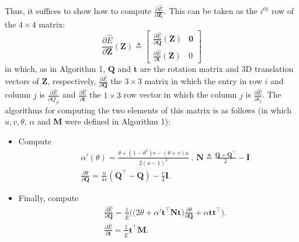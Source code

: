 Thus, it suffices to show how to compute $\frac{\partial \widehat{E}}{\partial \mathbf{Z}_i}$. This can be taken as the $i^{th}$ row of the $4 \times 4$ matrix:
\begin{equation}
    \frac{\partial \widehat{E}}{\partial \mathbf{Z}}(\mathbf{Z}) \triangleq \left[\begin{array}{cc} \frac{\partial \widehat{E}}{\partial \mathbf{Q}}( \mathbf{Z}) & \mathbf{0} \\
    \frac{\partial \widehat{E}}{\partial \mathbf{t}}( \mathbf{Z}) & 0 \end{array}\right]
\end{equation}
\noindent in which, as in Algorithm 1, $\mathbf{Q}$ and $\mathbf{t}$ are the rotation matrix and 3D translation vectors of $\mathbf{Z}$, respectively,  $ \frac{\partial \widehat{E}}{\partial \mathbf{Q}}$ the $3 \times 3$ matrix in which the entry in row $i$ and column $j$ is $\frac{\partial \widehat{E}}{\partial Q_{ji}}$ and $\frac{\partial \widehat{E}}{\partial \mathbf{t}}$ the $1 \times 3$ row vector in which the column $j$ is $\frac{\partial \widehat{E}}{\partial t_j}$. The algorithms for computing the two elements of this matrix is as follows (in which $u, v, \theta$, $\alpha$ and $\mathbf{M}$ were defined in Algorithm 1):

\begin{itemize}
    \item Compute 
    \begin{eqnarray}
       &&  \alpha'(\theta) = \frac{ \theta {+} (1 {-}\theta^2) v{-} (\theta+v)u}{2(u-1)^3} \ , \ \mathbf{N} {\triangleq} \frac{\mathbf{Q}{+}\mathbf{Q}^\top}{2}{-}\mathbf{I} \nonumber \\
       && \frac{\partial \theta}{\partial \mathbf{Q}} = \frac{u}{4v}(\mathbf{Q}^{\top}-\mathbf{Q}) - \frac{v}{2}\mathbf{I}.
    \end{eqnarray}
    \item Finally, compute 
    \begin{eqnarray}
        && \frac{\partial \widehat{E}}{\partial \mathbf{Q}} = \frac{1}{\widehat{E}}\Bigg(\big(2\theta + \alpha' \mathbf{t}^{\top}\mathbf{N}\mathbf{t} \big) \frac{\partial \theta}{\partial \mathbf{Q}} + \alpha \mathbf{t}\mathbf{t}^{\top}\Bigg). \nonumber \\
        && \frac{\partial \widehat{E}}{\partial \mathbf{t}} = \frac{1}{\widehat{E}} \mathbf{t}^{\top} \mathbf{M} .
    \end{eqnarray}
\end{itemize}
